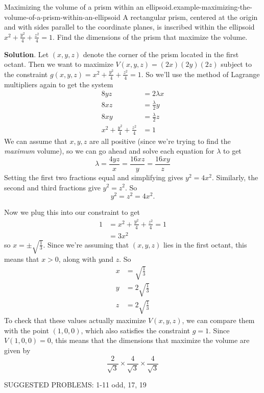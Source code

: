 \documentclass[10pt,]{book}
\numberwithin{equation}{section}
\begin{document}
\begin{example}{Maximizing the volume of a prism within an ellipsoid.}{example-maximizing-the-volume-of-a-prism-within-an-ellipsoid}%
\hypertarget{p-1452}{}%
A rectangular prism, centered at the origin and with sides parallel to the coordinate planes, is inscribed within the ellipsoid \(x^{2} + \frac{y^{2}}{4} + \frac{z^{2}}{4} = 1\). Find the dimensions of the prism that maximize the volume.%
\par\smallskip%
\noindent\textbf{Solution}.\hypertarget{solution-237}{}\quad%
\hypertarget{p-1453}{}%
Let \((x,y,z)\) denote the corner of the prism located in the first octant. Then we want to maximize \(V(x,y,z) = (2x)(2y)(2z)\) subject to the constraint \(g(x,y,z) = x^{2} + \frac{y^{2}}{4} + \frac{z^{2}}{4} = 1\). So we'll use the method of Lagrange multipliers again to get the system%
\begin{align*}
8yz & = 2\lambda x \\
8xz & = \frac{\lambda}{2}y \\
8xy & = \frac{\lambda}{2}z \\
x^{2} + \frac{y^{2}}{4} + \frac{z^{2}}{4} & =1 
\end{align*}
We can assume that \(x,y,z\) are all positive (since we're trying to find the \emph{maximum} volume), so we can go ahead and solve each equation for \(\lambda\) to get%
\begin{equation*}
\lambda = \frac{4yz}{x} = \frac{16xz}{y} = \frac{16xy}{z}
\end{equation*}
Setting the first two fractions equal and simplifying gives \(y^{2} = 4x^{2}\). Similarly, the second and third fractions give \(y^{2} = z^{2}\). So%
\begin{equation*}
y^{2} = z^{2} = 4x^{2}.
\end{equation*}
%
\par
\hypertarget{p-1454}{}%
Now we plug this into our constraint to get%
\begin{align*}
1 & = x^{2} + \frac{y^{2}}{4} + \frac{z^{2}}{4} = 1 \\
& = 3x^{2} 
\end{align*}
so \(x = \pm\sqrt{\frac{1}{3}}\). Since we're assuming that \((x,y,z)\) lies in the first octant, this means that \(x > 0\), along with \(y \)and \(z\). So%
\begin{align*}
x & = \sqrt{\frac{1}{3}} \\
y & = 2\sqrt{\frac{1}{3}} \\
z & = 2\sqrt{\frac{1}{3}} 
\end{align*}
To check that these values actually maximize \(V(x,y,z)\), we can compare them with the point \((1,0,0)\), which also satisfies the constraint \(g = 1\). Since \(V(1,0,0) = 0\), this means that the dimensions that maximize the volume are given by%
\begin{equation*}
\frac{2}{\sqrt{3}}\times\frac{4}{\sqrt{3}}\times\frac{4}{\sqrt{3}}
\end{equation*}
%
\end{example}
\hypertarget{p-1455}{}%
SUGGESTED PROBLEMS: 1-11 odd, 17, 19%
%
%
\typeout{************************************************}
\typeout{************************************************}
%
\end{document}
